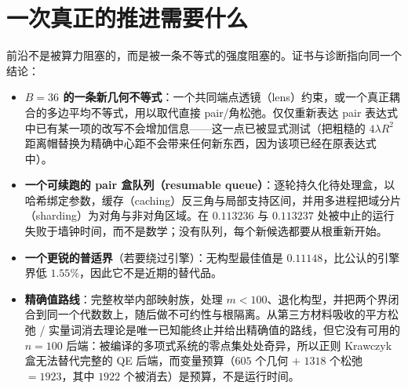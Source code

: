 \section{一次真正的推进需要什么}

前沿不是被算力阻塞的，而是被一条不等式的强度阻塞的。证书与诊断指向同一个结论：

\begin{itemize}[leftmargin=1.4em,itemsep=3pt]
\item \textbf{$B=36$ 的一条新几何不等式}：一个共同端点透镜（lens）约束，或一个真正耦合的多边平均不等式，用以取代直接 pair/角松弛。仅仅重新表达 pair 表达式中已有某一项的改写不会增加信息——这一点已被显式测试（把粗糙的 $4\lambda R^2$ 距离帽替换为精确中心距不会带来任何新东西，因为该项已经在原表达式中）。
\item \textbf{一个可续跑的 pair 盒队列（resumable queue）}：逐轮持久化待处理盒，以哈希绑定参数，缓存（caching）反三角与局部支持区间，并用多进程把域分片（sharding）为对角与非对角区域。在 $0.113236$ 与 $0.113237$ 处被中止的运行失败于墙钟时间，而不是数学；没有队列，每个新候选都要从根重新开始。
\item \textbf{一个更锐的普适界}（若要绕过引擎）：无构型最佳值是 $0.11148$，比公认的引擎界低 $1.55\%$，因此它不是近期的替代品。
\item \textbf{精确值路线}：完整枚举内部映射族，处理 $m<100$、退化构型，并把两个界闭合到同一个代数数上，随后做不可约性与根隔离。从第三方材料吸收的平方松弛 / 实量词消去理论是唯一已知能终止并给出精确值的路线，但它没有可用的 $n=100$ 后端：被编译的多项式系统的零点集处处奇异，所以正则 Krawczyk 盒无法替代完整的 QE 后端，而变量预算（$605$ 个几何 $+$ $1318$ 个松弛 $=1923$，其中 $1922$ 个被消去）是预算，不是运行时间。
\end{itemize}
